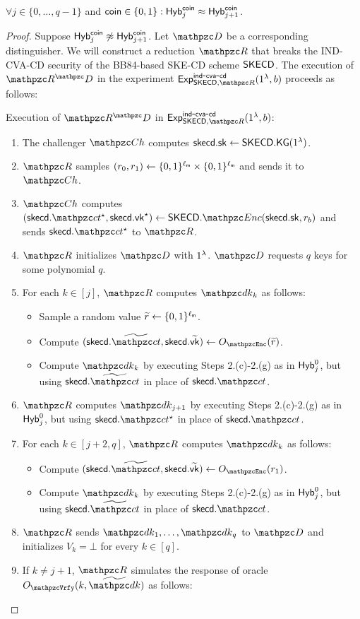 \begin{lemma}
$\forall j \in \{0, \ldots, q-1\}$ and $\mathsf{coin} \in \{0,1\}: \mathsf{Hyb}_j^{\mathsf{coin}} \approx \mathsf{Hyb}_{j+1}^{\mathsf{coin}}$.
\end{lemma}
\begin{proof}
Suppose $\mathsf{Hyb}_j^{\mathsf{coin}} \not \approx \mathsf{Hyb}_{j+1}^{\mathsf{coin}}$. Let $\qD$ be
a corresponding distinguisher. We will
construct a reduction $\qR$ that breaks the IND-CVA-CD security of
the BB84-based SKE-CD scheme $\mathsf{SKECD}$. The execution of $\qR^\qD$ in
the experiment $\expc{\SKECD,\qR}{ind}{cva}{cd}(1^\secp,b)$ proceeds
as follows:

\begin{description}
\item Execution of $\qR^\qD$ in
$\expc{\SKECD,\qR}{ind}{cva}{cd}(1^\secp,b)$:

\begin{enumerate}
\item The challenger $\qCh$ computes $\mathsf{skecd}.\mathsf{sk} \leftarrow
\mathsf{SKECD}.\mathsf{KG}(1^\lambda)$.
\item $\qR$ samples $(r_0, r_1) \leftarrow \{0,1\}^{\ell_{\mathsf{m}}} \times
    \{0,1\}^{\ell_{\mathsf{m}}}$ and
sends it to $\qCh$.
\item $\qCh$ computes $(\skecd.\qct^\star, \skecd.\vk^\star)
\leftarrow
\SKECD.\qEnc(\skecd.\sk, r_b)$ and sends $\skecd.\qct^\star$ to $\qR$.
\item $\qR$ initializes $\qD$ with $1^\lambda$. $\qD$ requests $q$ keys for some polynomial $q$.

\item For each $k \in [j]$, $\qR$ computes $\qdk_k$ as follows:
\begin{itemize}
\item Sample a random value $\widetilde{r} \leftarrow
    \{0,1\}^{\ell_{\mathsf{m}}}$.
\item Compute $(\skecd.\widetilde{\qct}, \skecd.\widetilde{\vk}) \leftarrow
    \Oracle{\qEnc}(\widetilde{r})$.
\item Compute $\qdk_k$ by executing Steps 2.(c)-2.(g) as in
$\mathsf{Hyb}_j^0$, but using $\skecd.\widetilde{\qct}$ in place of
$\skecd.\qct$.
\end{itemize}

\item $\qR$ computes $\qdk_{j+1}$ by executing Steps 2.(c)-2.(g) as
in $\mathsf{Hyb}_j^0$, but using $\skecd.\qct^\star$ in place of
$\skecd.\qct$.

\item For each $k \in [j+2,q]$, $\qR$ computes $\qdk_k$ as follows:
\begin{itemize}
\item Compute $(\skecd.\widetilde{\qct}, \skecd.\widetilde{\vk}) \leftarrow
\Oracle{\qEnc}(r_1)$.
\item Compute $\qdk_k$ by executing Steps 2.(c)-2.(g) as in
$\mathsf{Hyb}_j^0$, but using $\skecd.\widetilde{\qct}$ in place of
$\skecd.\qct$.
\end{itemize}
\item $\qR$ sends $\qdk_1, \ldots, \qdk_q$ to $\qD$ and initializes
$V_k = \bot$ for every $k \in [q]$.
\item If $k \neq j+1$, $\qR$ simulates
the response  of oracle $\Oracle{\qVrfy}(k, \widetilde{\qdk})$ as follows:


\end{enumerate}
\end{description}
\end{proof}
